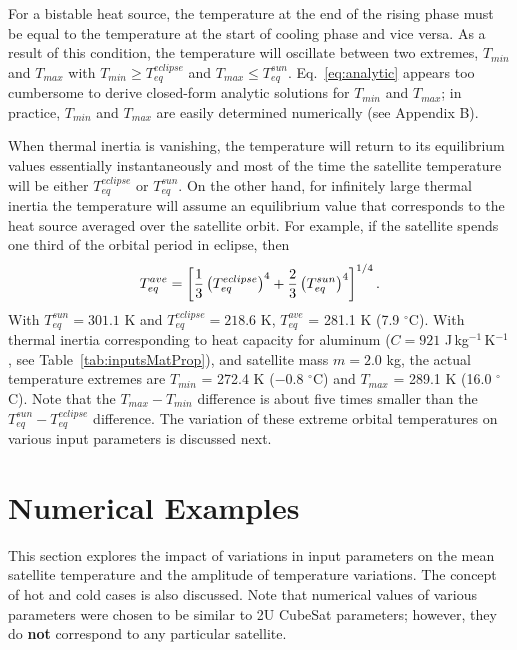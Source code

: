 \documentclass[]{aastex62}
\def\eq#1{\begin{equation} #1 \end{equation}}
\begin{document}
For a bistable heat source, the temperature at the end of the rising phase must be equal to the
temperature at the start of cooling phase and vice versa. As a result of this condition, the 
temperature will oscillate between two extremes, $T_{min}$ and $T_{max}$ with $T_{min} \ge T_{eq}^{eclipse}$ 
and $T_{max} \le T_{eq}^{sun}$.  Eq.~\ref{eq:analytic} appears too cumbersome to derive closed-form
analytic solutions for  $T_{min}$ and $T_{max}$; in practice,  $T_{min}$ and $T_{max}$ are easily determined
numerically (see Appendix B). 

When thermal inertia is vanishing, the temperature will return to its equilibrium values essentially
instantaneously and most of the time the satellite temperature will be either $T_{eq}^{eclipse}$ or $T_{eq}^{sun}$. 
On the other hand, for infinitely large thermal inertia the temperature will assume an equilibrium
value that corresponds to the heat source averaged over the satellite orbit. For example, if the satellite 
spends one third of the orbital period in eclipse, then
\eq{
\label{eq:TeqAve} 
      T_{eq}^{ave} = \left[ {1\over 3} \left(T_{eq}^{eclipse}\right)^4 +  {2\over 3} \left(T_{eq}^{sun}\right)^4 \right]^{1/4}. 
}
With $T_{eq}^{sun} = 301.1$ K and $T_{eq}^{eclipse} = 218.6$ K,  $T_{eq}^{ave}$ = 281.1 K  (7.9 $^\circ$C).  
With thermal inertia corresponding to heat capacity for aluminum ($C=921$ J\,kg$^{-1}$\,K$^{-1}$, see
Table~\ref{tab:inputsMatProp}), and satellite mass $m=2.0$ kg, the actual temperature extremes are $T_{min}$ = 272.4 K 
($-$0.8 $^\circ$C) and $T_{max}$ = 289.1 K  (16.0 $^\circ$C). Note that the $T_{max} - T_{min}$ difference  is about
five times smaller than the $T_{eq}^{sun}  - T_{eq}^{eclipse}$ difference. The variation of these extreme orbital 
temperatures on various input parameters is discussed next. 


\section{Numerical Examples} 

This section explores the impact of variations in input parameters on the mean satellite temperature and the 
amplitude of temperature variations.  The concept of hot and cold cases is also discussed. Note that numerical
values of various parameters were chosen to be similar to 2U CubeSat parameters; however, they do {\bf not}
correspond to any particular satellite. 
\end{document}

